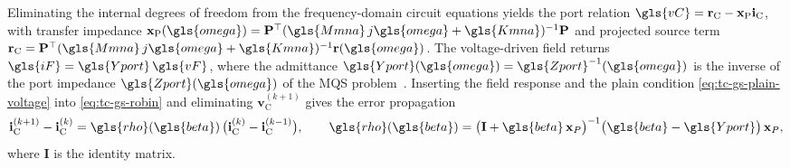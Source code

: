 Eliminating the internal degrees of freedom from the frequency-domain circuit equations yields the port relation $\gls{vC} = \mathbf{r}_{\text{C}} - \mathbf{x}_{\text{P}} \mathbf{i}_{\text{C}}$, with transfer impedance $\mathbf{x}_{\text{P}}(\gls{omega}) = \mathbf{P}^\top(\gls{Mmna}\, j\gls{omega} + \gls{Kmna})^{-1}\mathbf{P}$ and projected source term $\mathbf{r}_{\text{C}} = \mathbf{P}^\top(\gls{Mmna}\, j\gls{omega} + \gls{Kmna})^{-1} \mathbf{r}(\gls{omega})$.
The voltage-driven field returns $\gls{iF} = \gls{Yport}\,\gls{vF}$, where the admittance $\gls{Yport}(\gls{omega}) = \gls{Zport}^{-1}(\gls{omega})$ is the inverse of the port impedance $\gls{Zport}(\gls{omega})$ of the MQS problem~\cite{Garcia2017}. Inserting the field response and the plain condition \eqref{eq:tc-gs-plain-voltage} into \eqref{eq:tc-gs-robin} and eliminating $\mathbf{v}_{\text{C}}^{(k+1)}$ gives the error propagation
\begin{equation*}
    \mathbf{i}_{\text{C}}^{(k+1)} - \mathbf{i}_{\text{C}}^{(k)}
      = \gls{rho}(\gls{beta})\,\big(\mathbf{i}_{\text{C}}^{(k)} - \mathbf{i}_{\text{C}}^{(k-1)}\big),
    \qquad
    \gls{rho}(\gls{beta}) = \big(\mathbf{I} + \gls{beta}\,\mathbf{x}_P\big)^{-1}
                  \big(\gls{beta} - \gls{Yport}\big)\,\mathbf{x}_P ,
\end{equation*}
where $\mathbf{I}$ is the identity matrix.

